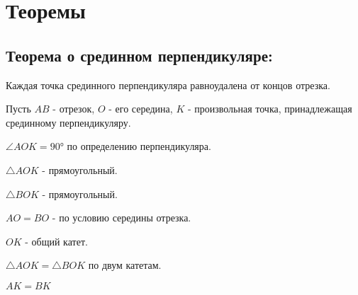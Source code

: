 \section{Теоремы}
\subsection{Теорема о срединном перпендикуляре:} Каждая точка срединного перпендикуляра равноудалена от концов отрезка.

Пусть $AB$ - отрезок, $O$ - его середина, $K$ - произвольная точка, принадлежащая срединному перпендикуляру.

$\angle AOK = 90°$ по определению перпендикуляра.

$\triangle AOK$ - прямоугольный.

$\triangle BOK$ - прямоугольный.

$AO = BO$ - по условию середины отрезка.

$OK$ - общий катет.

$\triangle AOK = \triangle BOK$ по двум катетам.

$AK = BK$
